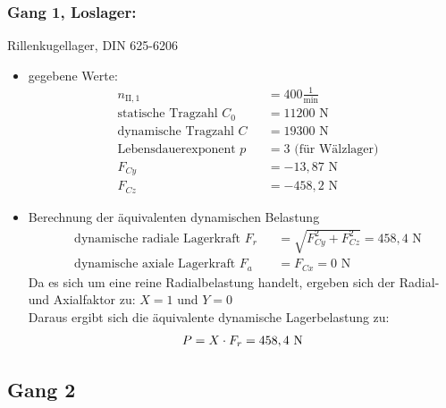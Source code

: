 \subsubsection{Gang 1, Loslager:} Rillenkugellager, DIN 625-6206\\
\begin{itemize}
	\item gegebene Werte:
	\begin{align*}
	&n_{{\mathord{\mathrm{II}},1}} &&=  400 \frac{1}{\text{min}} \\
	&\text{statische Tragzahl } C_{0} &&= 11200 \text{ N}\\
	&\text{dynamische Tragzahl } C &&= 19300 \text{ N} \\
	&\text{Lebensdauerexponent } p &&= 3 \text{ (für Wälzlager)} \\
	&F_{Cy} && = -13,87 \text{ N}\\
	&F_{Cz} && = -458,2 \text{ N}
	\end{align*} 
	\item Berechnung der äquivalenten dynamischen Belastung
	\begin{align*}
	&\text{dynamische radiale Lagerkraft } F_r&& = \sqrt{F_{Cy}^2 + F_{Cz}^2 } = 458,4 \text{ N} \\
	&\text{dynamische axiale Lagerkraft } F_a&& = F_{Cx} = 0\text{ N}
	\end{align*} 
	Da es sich um eine reine Radialbelastung handelt, ergeben sich der Radial- und Axialfaktor zu: $X= 1$ und $Y=0$\\
	Daraus ergibt sich die äquivalente dynamische Lagerbelastung zu:  
	\[
	P= X \cdot F_r =458,4 \text{ N}
	\]
\end{itemize}
\newpage

\subsection{Gang 2}
